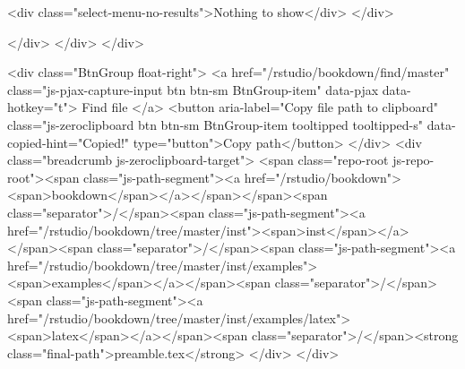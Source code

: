         <div class="select-menu-no-results">Nothing to show</div>
      </div>

    </div>
  </div>
</div>

    <div class="BtnGroup float-right">
      <a href="/rstudio/bookdown/find/master"
            class="js-pjax-capture-input btn btn-sm BtnGroup-item"
            data-pjax
            data-hotkey="t">
        Find file
      </a>
      <button aria-label="Copy file path to clipboard" class="js-zeroclipboard btn btn-sm BtnGroup-item tooltipped tooltipped-s" data-copied-hint="Copied!" type="button">Copy path</button>
    </div>
    <div class="breadcrumb js-zeroclipboard-target">
      <span class="repo-root js-repo-root"><span class="js-path-segment"><a href="/rstudio/bookdown"><span>bookdown</span></a></span></span><span class="separator">/</span><span class="js-path-segment"><a href="/rstudio/bookdown/tree/master/inst"><span>inst</span></a></span><span class="separator">/</span><span class="js-path-segment"><a href="/rstudio/bookdown/tree/master/inst/examples"><span>examples</span></a></span><span class="separator">/</span><span class="js-path-segment"><a href="/rstudio/bookdown/tree/master/inst/examples/latex"><span>latex</span></a></span><span class="separator">/</span><strong class="final-path">preamble.tex</strong>
    </div>
  </div>


